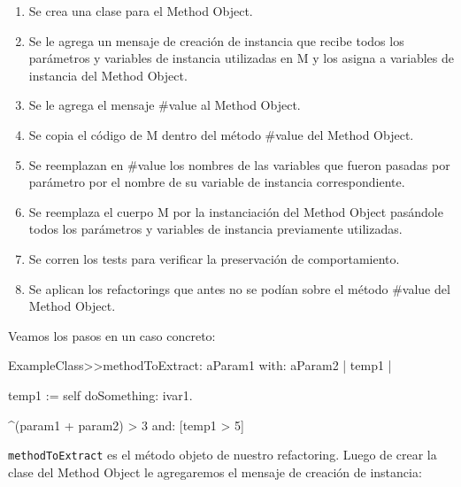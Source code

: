 \begin{enumerate}
    \item Se crea una clase para el Method Object.
    \item Se le agrega un mensaje de creación de instancia que recibe todos los
      parámetros y variables de instancia utilizadas en M y los asigna a
      variables de instancia del Method Object.
    \item Se le agrega el mensaje \#value al Method Object.
    \item Se copia el código de M dentro del método \#value del Method Object.
    \item Se reemplazan en \#value los nombres de las variables que fueron
      pasadas por parámetro por el nombre de su variable de instancia
      correspondiente.
    \item Se reemplaza el cuerpo M por la instanciación del Method Object
      pasándole todos los parámetros y variables de instancia previamente
      utilizadas.
    \item Se corren los tests para verificar la preservación de comportamiento.
    \item Se aplican los refactorings que antes no se podían sobre el método
      \#value del Method Object.
\end{enumerate}

Veamos los pasos en un caso concreto:

\begin{code}
  ExampleClass>>methodToExtract: aParam1 with: aParam2
    | temp1 |

    temp1 := self doSomething: ivar1.

    ^(param1 + param2) > 3 and: [temp1 > 5]
\end{code}

\lstinline{methodToExtract} es el método objeto de nuestro refactoring. Luego de
crear la clase del Method Object le agregaremos el mensaje de creación de
instancia:

